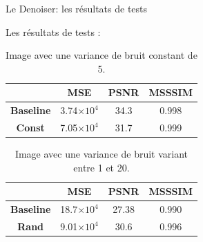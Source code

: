 \documentclass[11pt]{beamer}
\begin{document}
\begin{frame}{Le Denoiser: les résultats de tests}

    Les résultats de tests :
    \begin{table}
        \centering
        \begin{tabular}{|c|c|c|c|}
            \hline
             & MSE & PSNR & MSSSIM \\
             \hline
            \textbf{Baseline} & 3.74$\times 10^4$ & 34.3 & 0.998\\
            \textbf{Const} & 7.05$\times 10^4$ & 31.7 & 0.999 \\
            \hline
        \end{tabular}
        \caption{Image avec une variance de bruit constant de 5.}
    \end{table}

    \begin{table}
        \centering
        \begin{tabular}{|c|c|c|c|}
            \hline
             & MSE & PSNR & MSSSIM \\
             \hline
            \textbf{Baseline} & 18.7$\times 10^4$ & 27.38 & 0.990\\
            \textbf{Rand} & 9.01$\times 10^4$ & 30.6 & 0.996 \\
            \hline
        \end{tabular}
        \caption{Image avec une variance de bruit variant entre 1 et 20.}
    \end{table}
\end{frame}
\end{document}

